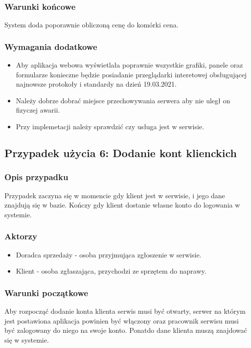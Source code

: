 \documentclass{article}
\begin{document}
\subsubsection{Warunki końcowe}
System doda poporawnie obliczoną cenę do komórki cena.
\subsubsection{Wymagania dodatkowe}
\begin{itemize}
    \item Aby aplikacja webowa wyświetlała poprawnie wszystkie grafiki, panele oraz formularze konieczne będzie posiadanie przeglądarki interetowej obsługującej najnowsze protokoły i standardy na dzień 19.03.2021.
    \item Należy dobrze dobrać miejsce przechowywania serwera aby nie uległ on fizyczej awarii.
    \item Przy implemetacji należy sprawdzić czy usługa jest w serwisie.
\end{itemize}
\subsection{Przypadek użycia 6: Dodanie kont klienckich}
\subsubsection{Opis przypadku}
Przypadek zaczyna się w momencie gdy klient jest w serwisie, i jego dane znajdują się w bazie. Kończy gdy klient dostanie własne konto do logowania w systemie.
\subsubsection{Aktorzy}
\begin{itemize}
    \item Doradca sprzedaży - osoba przyjmująca zgłoszenie w serwisie.
    \item Klient - osoba zgłaszająca, przychodzi ze sprzętem do naprawy.
\end{itemize}
\subsubsection{Warunki początkowe}
Aby rozpocząć dodanie konta klienta serwis musi być otwarty, serwer na którym jest postawiona aplikacja powinien być włączony oraz pracownik serwisu musi być zalogowany do niego
na swoje konto. Ponatdo dane klienta muszą znajdować się w systemie.
\end{document}
